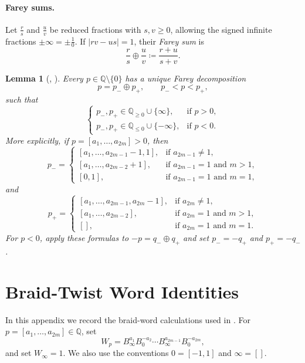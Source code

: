 \documentclass[11pt,a4paper,reqno]{amsart}%
\theoremstyle{plain}
\newtheorem{lemma}[lemma]{Lemma}
\theoremstyle{definition}
\numberwithin{equation}{section}
\numberwithin{equation}{section}
\def\QQ{\mathbb{Q}}
\begin{document}
\paragraph{\textbf{Farey sums.}}
Let $\frac{r}{s}$ and $\frac{u}{v}$ be reduced fractions with $s,v\geq0$,
allowing the signed infinite fractions $\pm\infty=\pm\frac{1}{0}$. If
$|rv-us|=1$, their \emph{Farey sum} is
\[
\frac{r}{s}\oplus\frac{u}{v}\coloneqq\frac{r+u}{s+v}.
\]

\begin{lemma}[{\cite[Section 2]{MGO}, \cite[Lemma/Definition 2.3]{FQ}}]\label{lem:farey-decomposition}
Every $p\in\mathbb Q\setminus\{0\}$ has a unique Farey decomposition
\[
p=p_-\oplus p_+,
\qquad p_-<p<p_+,
\]
such that
\[
\begin{cases}
 p_-,p_+\in\mathbb Q_{\geq0}\cup\{\infty\},&\text{if }p>0,\\
 p_-,p_+\in\mathbb Q_{\leq0}\cup\{-\infty\},&\text{if }p<0.
\end{cases}
\]
More explicitly, if $p=[a_1,\ldots,a_{2m}]>0$, then
\[
p_-=
\begin{cases}
[a_1,\ldots,a_{2m-1}-1,1],&\text{if }a_{2m-1}\ne1,\\
[a_1,\ldots,a_{2m-2}+1],&\text{if }a_{2m-1}=1\text{ and }m>1,\\
[0,1],&\text{if }a_{2m-1}=1\text{ and }m=1,
\end{cases}
\]
and
\[
p_+=
\begin{cases}
[a_1,\ldots,a_{2m-1},a_{2m}-1],&\text{if }a_{2m}\ne1,\\
[a_1,\ldots,a_{2m-2}],&\text{if }a_{2m}=1\text{ and }m>1,\\
[],&\text{if }a_{2m}=1\text{ and }m=1.
\end{cases}
\]
For $p<0$, apply these formulas to $-p=q_-\oplus q_+$ and set
$p_-=-q_+$ and $p_+=-q_-$.
\end{lemma}
\section{Braid-Twist Word Identities}\label{app:bt-words}
In this appendix we record the braid-word calculations used in
.
For $p=[a_1,\ldots,a_{2m}]\in\QQ$, set
\[
W_p=B_\infty^{a_1}B_0^{-a_2}\cdots B_\infty^{a_{2m-1}}B_0^{-a_{2m}},
\]
and set $W_\infty=1$. We also use the conventions $0=[-1,1]$ and
$\infty=[]$.
\end{document}
